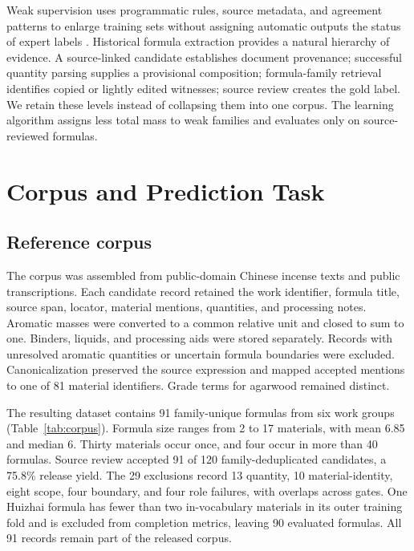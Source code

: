\documentclass[11pt,a4paper]{article}
\begin{document}
Weak supervision uses programmatic rules, source metadata, and agreement patterns to enlarge training sets without assigning automatic outputs the status of expert labels \citep{ratner2017_snorkel}. Historical formula extraction provides a natural hierarchy of evidence. A source-linked candidate establishes document provenance; successful quantity parsing supplies a provisional composition; formula-family retrieval identifies copied or lightly edited witnesses; source review creates the gold label. We retain these levels instead of collapsing them into one corpus. The learning algorithm assigns less total mass to weak families and evaluates only on source-reviewed formulas.

\section{Corpus and Prediction Task}

\subsection{Reference corpus}

The corpus was assembled from public-domain Chinese incense texts and public transcriptions. Each candidate record retained the work identifier, formula title, source span, locator, material mentions, quantities, and processing notes. Aromatic masses were converted to a common relative unit and closed to sum to one. Binders, liquids, and processing aids were stored separately. Records with unresolved aromatic quantities or uncertain formula boundaries were excluded. Canonicalization preserved the source expression and mapped accepted mentions to one of 81 material identifiers. Grade terms for agarwood remained distinct.

The resulting dataset contains 91 family-unique formulas from six work groups (Table~\ref{tab:corpus}). Formula size ranges from 2 to 17 materials, with mean 6.85 and median 6. Thirty materials occur once, and four occur in more than 40 formulas. Source review accepted 91 of 120 family-deduplicated candidates, a 75.8\% release yield. The 29 exclusions record 13 quantity, 10 material-identity, eight scope, four boundary, and four role failures, with overlaps across gates. One Huizhai formula has fewer than two in-vocabulary materials in its outer training fold and is excluded from completion metrics, leaving 90 evaluated formulas. All 91 records remain part of the released corpus.
\end{document}
